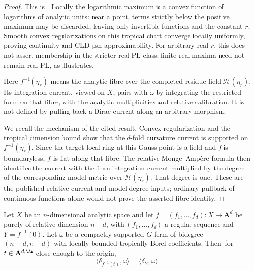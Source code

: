 \begin{proof}
This is \cite[Corollary~18.6.2]{CLD25}.  Locally the logarithmic maximum
is a convex function of logarithms of analytic units: near a point, terms
strictly below the positive maximum may be discarded, leaving only
invertible functions and the constant $r$.  Smooth convex regularizations
on this tropical chart converge locally uniformly, proving continuity and
CLD-psh approximability.  For arbitrary real $r$, this does not assert
membership in the stricter real PL class: finite real maxima need not
remain real PL, as \cite[Example~5.3]{GJR26} illustrates.

Here $f^{-1}(\eta_r)$ means the analytic fibre over the completed residue
field $\mathcal H(\eta_r)$.  Its integration current, viewed on $X$, pairs
with $\omega$ by integrating the restricted form on that fibre, with the
analytic multiplicities and relative calibration.  It is not defined by
pulling back a Dirac current along an arbitrary morphism.

We recall the mechanism of the cited result.  Convex regularization and
the tropical dimension bound show that the $d$-fold curvature current is
supported on $f^{-1}(\eta_r)$.  Since the target local ring at this Gauss
point is a field and $f$ is boundaryless, $f$ is flat along that fibre.
The relative Monge--Amp\`ere formula
\cite[Proposition~18.6.1]{CLD25} then identifies the current with the fibre
integration current multiplied by the degree of the corresponding model
metric over $\mathcal H(\eta_r)$.  That degree is one.  These are the
published relative-current and model-degree inputs; ordinary pullback of
continuous functions alone would not prove the asserted fibre identity.
\end{proof}

\begin{proposition}
\label{prop:ch15-bm-fibre-stabilizes}
Let $X$ be an $n$-dimensional analytic space and let
$f=(f_1,\dots,f_d):X\to\mathbf A^d$ be purely of relative dimension $n-d$,
with $(f_1,\dots,f_d)$ a regular sequence and $Y=f^{-1}(0)$.  Let $\omega$ be
a compactly supported $G$-form of bidegree $(n-d,n-d)$ with locally bounded
tropically Borel coefficients.  Then, for $t\in\mathbf A^{d,\An}$ close
enough to the origin,
\[
 \langle\delta_{f^{-1}(t)},\omega\rangle=\langle\delta_Y,\omega\rangle .
\]
\end{proposition}

